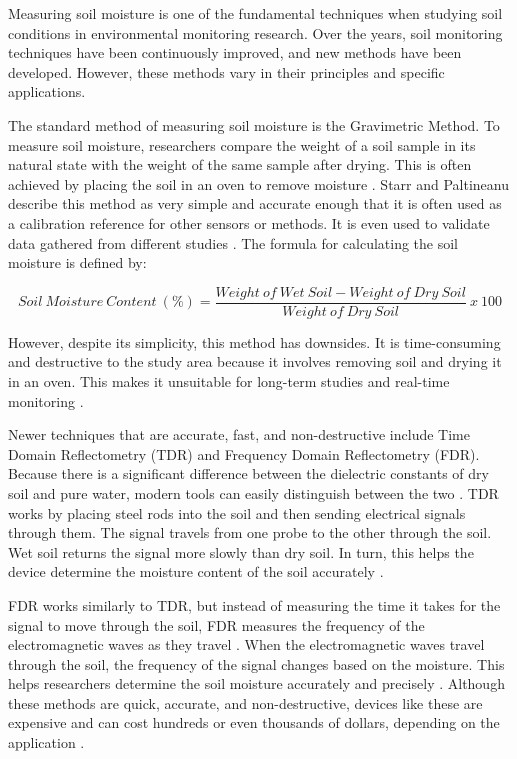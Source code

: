 Measuring soil moisture is one of the fundamental techniques when
studying soil conditions in environmental monitoring research. Over the
years, soil monitoring techniques have been continuously improved, and
new methods have been developed. However, these methods vary in their
principles and specific applications.

The standard method of measuring soil moisture is the Gravimetric
Method. To measure soil moisture, researchers compare the weight of
a soil sample in its natural state with the weight of the same sample after
drying. This is often achieved by placing the soil in an oven to remove
moisture \cite{ref24}. Starr and Paltineanu \cite{ref25} describe this method as
very simple and accurate enough that it is often used
as a calibration reference for other sensors or methods. It is even used to
validate data gathered from different studies \cite{ref26}\cite{ref27}. The
formula for calculating the soil moisture is defined by:

\begin{equation}
Soil\ Moisture\ Content\ (\%) = \frac{Weight\ of\ Wet\ Soil - Weight\ of\ Dry\ Soil}{Weight\ of\ Dry\ Soil}\ x\ 100
\label{eq:gravimetric-soil-moisture}
\end{equation}

However, despite its simplicity, this method has downsides. It
is time-consuming and destructive to the study area because it
involves removing soil and drying it in an
oven. This makes it unsuitable for long-term studies and real-time
monitoring \cite{ref24}.

Newer techniques that are accurate, fast, and
non-destructive include Time Domain Reflectometry (TDR) and
Frequency Domain Reflectometry (FDR). Because there is a significant
difference between the dielectric constants of dry soil and pure water,
modern tools can easily distinguish between the two \cite{ref28}. TDR works
by placing steel rods into the soil and then sending electrical signals
through them. The signal travels from one probe to the other through
the soil. Wet soil returns the signal more slowly than dry soil.
In turn, this helps the device
determine the moisture content of the soil accurately \cite{ref19}\cite{ref29}.

FDR works similarly to TDR, but instead of measuring the time it takes
for the signal to move through the soil, FDR measures the frequency of
the electromagnetic waves as they travel \cite{ref28}. When the
electromagnetic waves travel through the soil, the frequency of the
signal changes based on the moisture. This helps researchers determine
the soil moisture accurately and precisely \cite{ref30}. Although these
methods are quick, accurate, and non-destructive, devices like these
are expensive and can cost hundreds or even thousands of dollars,
depending on the application \cite{ref19}.

